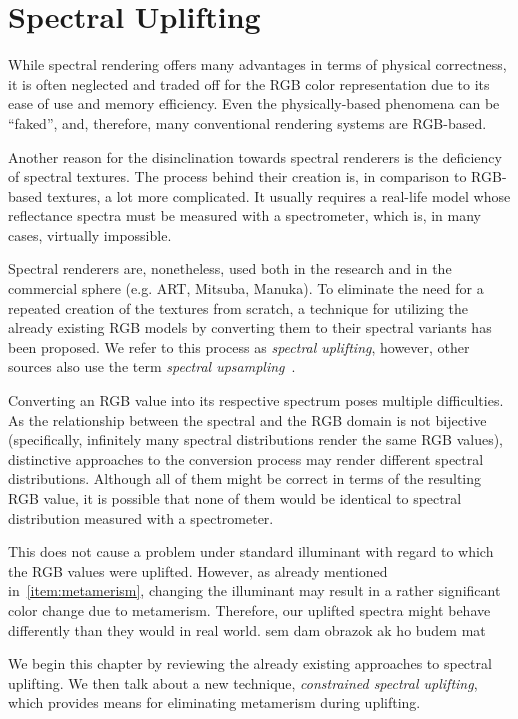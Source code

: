 \chapter{Spectral Uplifting}

While spectral rendering offers many advantages in terms of physical correctness, it is often neglected and traded off for the RGB color representation due to its ease of use and memory efficiency. Even the physically-based phenomena can be ``faked'', and, therefore, many conventional rendering systems are RGB-based. 

Another reason for the disinclination towards spectral renderers is the deficiency of spectral textures. The process behind their creation is, in comparison to RGB-based textures, a lot more complicated. It usually requires a real-life model whose reflectance spectra must be measured with a spectrometer, which is, in many cases, virtually impossible.  

Spectral renderers are, nonetheless, used both in the research and in the commercial sphere (e.g. ART, Mitsuba, Manuka). To eliminate the need for a repeated creation of the textures from scratch, a technique for utilizing the already existing RGB models by converting them to their spectral variants has been proposed. We refer to this process as \emph{spectral uplifting}, however, other sources also use the term \emph{spectral upsampling}~\cite{sigmoidMethod}.

Converting an RGB value into its respective spectrum poses multiple difficulties. As the relationship between the spectral and the RGB domain is not bijective (specifically, infinitely many spectral distributions render the same RGB values), distinctive approaches to the conversion process may render different spectral distributions. Although all of them might be correct in terms of the resulting RGB value, it is possible that none of them would be identical to spectral distribution measured with a spectrometer.

This does not cause a problem under standard illuminant with regard to which the RGB values were uplifted. However, as already mentioned in~\cref{item:metamerism}, changing the illuminant may result in a rather significant color change due to metamerism. Therefore, our uplifted spectra might behave differently than they would in real world. sem dam obrazok ak ho budem mat

We begin this chapter by reviewing the already existing approaches to spectral uplifting. We then talk about a new technique, \emph{constrained spectral uplifting}, which provides means for eliminating metamerism during uplifting.

